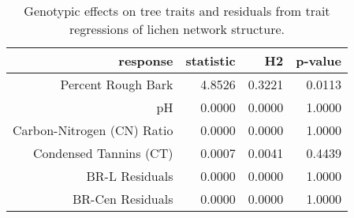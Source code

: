 \begin{table}[ht]
\centering
\begin{tabular}{rrrr}
  \hline
response & statistic & H2 & p-value \\ 
  \hline
Percent Rough Bark & 4.8526 & 0.3221 & 0.0113 \\ 
  pH & 0.0000 & 0.0000 & 1.0000 \\ 
  Carbon-Nitrogen (CN) Ratio & 0.0000 & 0.0000 & 1.0000 \\ 
  Condensed Tannins (CT) & 0.0007 & 0.0041 & 0.4439 \\ 
  BR-L Residuals & 0.0000 & 0.0000 & 1.0000 \\ 
  BR-Cen Residuals & 0.0000 & 0.0000 & 1.0000 \\ 
   \hline
\end{tabular}
\caption{Genotypic effects on tree traits and residuals from trait regressions of lichen network structure.} 
\label{tab:h2_trait}
\end{table}
